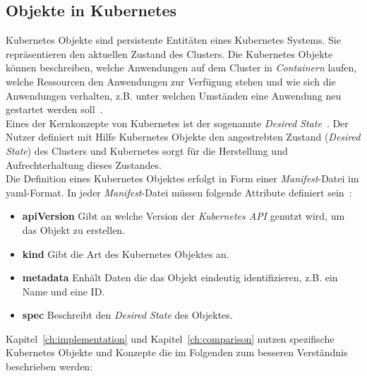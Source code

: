 \subsection{Objekte in Kubernetes}

Kubernetes Objekte sind persistente Entitäten eines Kubernetes Systems. Sie repräsentieren den aktuellen Zustand des Clusters.
Die Kubernetes Objekte können beschreiben, welche Anwendungen auf dem Cluster in \textit{Containern} laufen,
welche Ressourcen den Anwendungen zur Verfügung stehen und
wie sich die Anwendungen verhalten, z.B. unter welchen Umständen eine Anwendung neu gestartet werden soll~\cite{kubernetes-objects}.
\\
Eines der Kernkonzepte von Kubernetes ist der sogenannte \textit{Desired State}~\cite{kubernetes-objects-kodekloud}.
Der Nutzer definiert mit Hilfe Kubernetes Objekte den angestrebten Zustand (\textit{Desired State}) des Clusters und Kubernetes
sorgt für die Herstellung und Aufrechterhaltung dieses Zustandes.
\\
Die Definition eines Kubernetes Objektes erfolgt in Form einer \textit{Manifest}-Datei im \ac{yaml}-Format.
In jeder \textit{Manifest}-Datei müssen folgende Attribute definiert sein~\cite{kubernetes-objects}:

\begin{itemize}
      \setlength\itemsep{-0.5cm}
      \item
            \textbf{apiVersion} Gibt an welche Version der \textit{Kubernetes API} genutzt wird, um das Objekt zu erstellen.
      \item
            \textbf{kind}  Gibt die Art des Kubernetes Objektes an.
      \item
            \textbf{metadata}  Enhält Daten die das Objekt eindeutig identifizieren, z.B. ein Name und eine ID\@.
      \item
            \textbf{spec} Beschreibt den \textit{Desired State} des Objektes.
\end{itemize}

Kapitel~\ref{ch:implementation} und Kapitel~\ref{ch:comparison} nutzen spezifische Kubernetes Objekte und Konzepte die im Folgenden
zum besseren Verständnis beschrieben werden:

